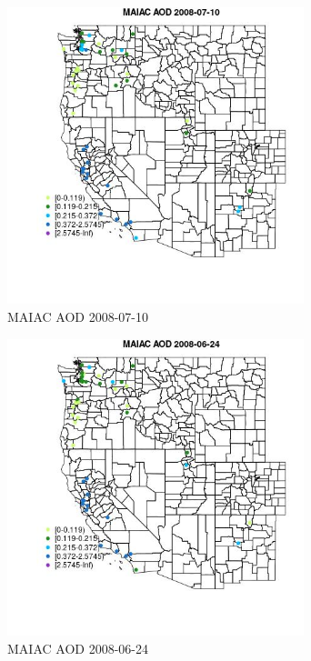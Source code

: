 \begin{figure} 
\centering  
\includegraphics[width=0.77\textwidth]{Code_Outputs/Report_ML_input_PM25_Step4_part_e_de_duplicated_aves_MapObsMAIAC_AOD2008-07-10.jpg} 
\caption{\label{fig:Report_ML_input_PM25_Step4_part_e_de_duplicated_avesMapObsMAIAC_AOD2008-07-10}MAIAC AOD 2008-07-10} 
\end{figure} 
 

\clearpage 

\begin{figure} 
\centering  
\includegraphics[width=0.77\textwidth]{Code_Outputs/Report_ML_input_PM25_Step4_part_e_de_duplicated_aves_MapObsMAIAC_AOD2008-06-24.jpg} 
\caption{\label{fig:Report_ML_input_PM25_Step4_part_e_de_duplicated_avesMapObsMAIAC_AOD2008-06-24}MAIAC AOD 2008-06-24} 
\end{figure} 
 

